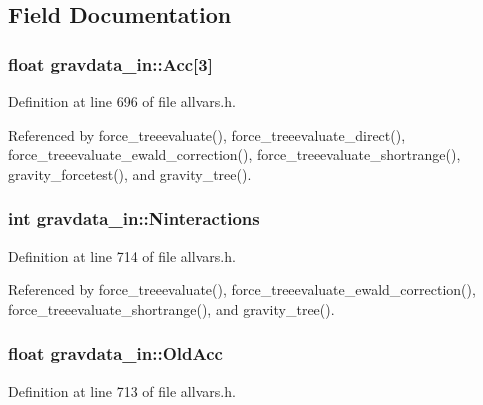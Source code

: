 \subsection{Field Documentation}
\hypertarget{structgravdata__in_a6850a5b240d113f9c28c27762d3c44ff}{
\subsubsection[{Acc}]{\setlength{\rightskip}{0pt plus 5cm}float {\bf gravdata\_\-in::Acc}\mbox{[}3\mbox{]}}}
\label{structgravdata__in_a6850a5b240d113f9c28c27762d3c44ff}


Definition at line 696 of file allvars.h.



Referenced by force\_\-treeevaluate(), force\_\-treeevaluate\_\-direct(), force\_\-treeevaluate\_\-ewald\_\-correction(), force\_\-treeevaluate\_\-shortrange(), gravity\_\-forcetest(), and gravity\_\-tree().

\hypertarget{structgravdata__in_a6b47f6ca387f17b375c949bbc9c0572f}{
\subsubsection[{Ninteractions}]{\setlength{\rightskip}{0pt plus 5cm}int {\bf gravdata\_\-in::Ninteractions}}}
\label{structgravdata__in_a6b47f6ca387f17b375c949bbc9c0572f}


Definition at line 714 of file allvars.h.



Referenced by force\_\-treeevaluate(), force\_\-treeevaluate\_\-ewald\_\-correction(), force\_\-treeevaluate\_\-shortrange(), and gravity\_\-tree().

\hypertarget{structgravdata__in_aba8345d83e2a1512a83563dbd87c9a3f}{
\subsubsection[{OldAcc}]{\setlength{\rightskip}{0pt plus 5cm}float {\bf gravdata\_\-in::OldAcc}}}
\label{structgravdata__in_aba8345d83e2a1512a83563dbd87c9a3f}


Definition at line 713 of file allvars.h.



